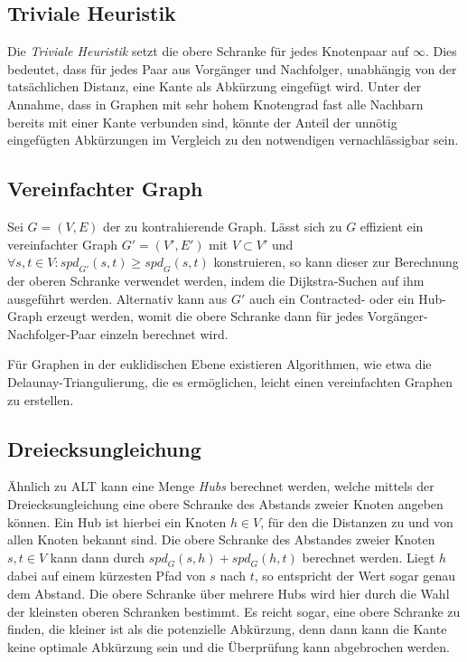 \subsection{Triviale Heuristik}

Die \emph{Triviale Heuristik} setzt die obere Schranke für jedes Knotenpaar auf $\infty$.
Dies bedeutet, dass für jedes Paar aus Vorgänger und Nachfolger, unabhängig von der tatsächlichen Distanz, eine Kante als Abkürzung eingefügt wird.
Unter der Annahme, dass in Graphen mit sehr hohem Knotengrad fast alle Nachbarn bereits mit einer Kante verbunden sind, könnte der Anteil der unnötig eingefügten Abkürzungen im Vergleich zu den notwendigen vernachlässigbar sein.

\subsection{Vereinfachter Graph}

Sei $G = (V, E)$ der zu kontrahierende Graph.
Lässt sich zu $G$ effizient ein vereinfachter Graph $G' = (V', E')$ mit $V \subset V'$ und $\forall s, t \in V \colon {spd}_{G'} (s, t) \geq {spd}_{G} (s, t)$ konstruieren, so kann dieser zur Berechnung der oberen Schranke verwendet werden, indem die Dijkstra-Suchen auf ihm ausgeführt werden.
Alternativ kann aus $G'$ auch ein Contracted- oder ein Hub-Graph erzeugt werden, womit die obere Schranke dann für jedes Vorgänger-Nachfolger-Paar einzeln berechnet wird.

Für Graphen in der euklidischen Ebene existieren Algorithmen, wie etwa die Delaunay-Triangulierung, die es ermöglichen, leicht einen vereinfachten Graphen zu erstellen.

\subsection{Dreiecksungleichung}

Ähnlich zu ALT \cite{goldberg2005computing} kann eine Menge \emph{Hubs} berechnet werden, welche mittels der Dreiecksungleichung eine obere Schranke des Abstands zweier Knoten angeben können.
Ein Hub ist hierbei ein Knoten $h \in V$, für den die Distanzen zu und von allen Knoten bekannt sind.
Die obere Schranke des Abstandes zweier Knoten $s, t \in V$ kann dann durch ${spd}_G (s, h) + {spd}_G (h, t)$ berechnet werden.
Liegt $h$ dabei auf einem kürzesten Pfad von $s$ nach $t$, so entspricht der Wert sogar genau dem Abstand.
Die obere Schranke über mehrere Hubs wird hier durch die Wahl der kleinsten oberen Schranken bestimmt.
Es reicht sogar, eine obere Schranke zu finden, die kleiner ist als die potenzielle Abkürzung, denn dann kann die Kante keine optimale Abkürzung sein und die Überprüfung kann abgebrochen werden.

